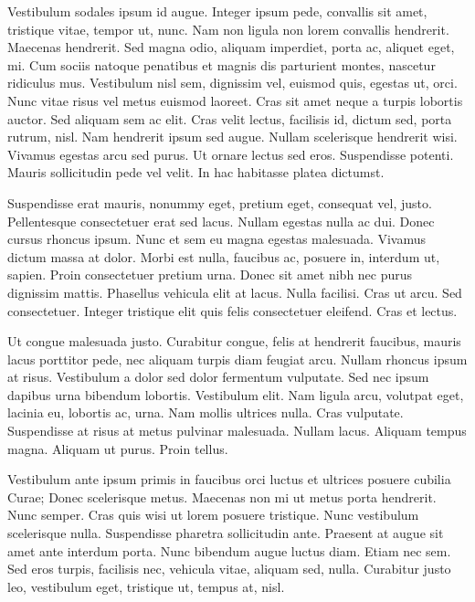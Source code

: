 \documentclass{article}
\begin{document}
Vestibulum sodales ipsum id augue. Integer ipsum pede, convallis sit amet,
tristique vitae, tempor ut, nunc. Nam non ligula non lorem convallis hendrerit.
Maecenas hendrerit. Sed magna odio, aliquam imperdiet, porta ac, aliquet eget,
mi. Cum sociis natoque penatibus et magnis dis parturient montes, nascetur
ridiculus mus. Vestibulum nisl sem, dignissim vel, euismod quis, egestas ut,
orci. Nunc vitae risus vel metus euismod laoreet. Cras sit amet neque a turpis
lobortis auctor. Sed aliquam sem ac elit. Cras velit lectus, facilisis id,
dictum sed, porta rutrum, nisl. Nam hendrerit ipsum sed augue. Nullam
scelerisque hendrerit wisi. Vivamus egestas arcu sed purus. Ut ornare lectus
sed eros. Suspendisse potenti. Mauris sollicitudin pede vel velit. In hac
habitasse platea dictumst.

Suspendisse erat mauris, nonummy eget, pretium eget, consequat vel, justo.
Pellentesque consectetuer erat sed lacus. Nullam egestas nulla ac dui. Donec
cursus rhoncus ipsum. Nunc et sem eu magna egestas malesuada. Vivamus dictum
massa at dolor. Morbi est nulla, faucibus ac, posuere in, interdum ut, sapien.
Proin consectetuer pretium urna. Donec sit amet nibh nec purus dignissim
mattis. Phasellus vehicula elit at lacus. Nulla facilisi. Cras ut arcu. Sed
consectetuer. Integer tristique elit quis felis consectetuer eleifend. Cras et
lectus.

Ut congue malesuada justo. Curabitur congue, felis at hendrerit faucibus,
mauris lacus porttitor pede, nec aliquam turpis diam feugiat arcu. Nullam
rhoncus ipsum at risus. Vestibulum a dolor sed dolor fermentum vulputate. Sed
nec ipsum dapibus urna bibendum lobortis. Vestibulum elit. Nam ligula arcu,
volutpat eget, lacinia eu, lobortis ac, urna. Nam mollis ultrices nulla. Cras
vulputate. Suspendisse at risus at metus pulvinar malesuada. Nullam lacus.
Aliquam tempus magna. Aliquam ut purus. Proin tellus.

Vestibulum ante ipsum primis in faucibus orci luctus et ultrices posuere
cubilia Curae; Donec scelerisque metus. Maecenas non mi ut metus porta
hendrerit. Nunc semper. Cras quis wisi ut lorem posuere tristique. Nunc
vestibulum scelerisque nulla. Suspendisse pharetra sollicitudin ante. Praesent
at augue sit amet ante interdum porta. Nunc bibendum augue luctus diam. Etiam
nec sem. Sed eros turpis, facilisis nec, vehicula vitae, aliquam sed, nulla.
Curabitur justo leo, vestibulum eget, tristique ut, tempus at, nisl.
\end{document}
